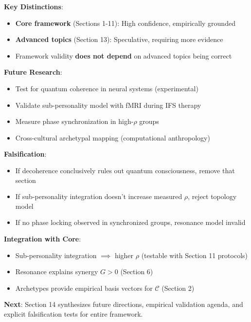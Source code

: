 \documentclass[11pt,a4paper]{article}
\theoremstyle{definition}
\theoremstyle{remark}
\newcommand{\CC}{\mathcal{C}}
\begin{document}
\begin{enumerate}
\begin{mdframed}[backgroundcolor=green!10,linewidth=2pt,linecolor=green!70!black]
\textbf{Key Distinctions}:
\begin{itemize}[nosep]
    \item \textbf{Core framework} (Sections 1-11): High confidence, empirically grounded
    \item \textbf{Advanced topics} (Section 13): Speculative, requiring more evidence
    \item Framework validity \textbf{does not depend} on advanced topics being correct
\end{itemize}

\textbf{Future Research}:
\begin{itemize}[nosep]
    \item Test for quantum coherence in neural systems (experimental)
    \item Validate sub-personality model with fMRI during IFS therapy
    \item Measure phase synchronization in high-\(\rho\) groups
    \item Cross-cultural archetypal mapping (computational anthropology)
\end{itemize}

\textbf{Falsification}:
\begin{itemize}[nosep]
    \item If decoherence conclusively rules out quantum consciousness, remove that section
    \item If sub-personality integration doesn't increase measured \(\rho\), reject topology model
    \item If no phase locking observed in synchronized groups, resonance model invalid
\end{itemize}

\textbf{Integration with Core}:
\begin{itemize}[nosep]
    \item Sub-personality integration \(\implies\) higher \(\rho\) (testable with Section 11 protocols)
    \item Resonance explains synergy \(G > 0\) (Section 6)
    \item Archetypes provide empirical basis vectors for \(\CC\) (Section 2)
\end{itemize}

\textbf{Next}: Section 14 synthesizes future directions, empirical validation agenda, and explicit falsification tests for entire framework.
\end{mdframed}



\end{enumerate}
\end{document}
